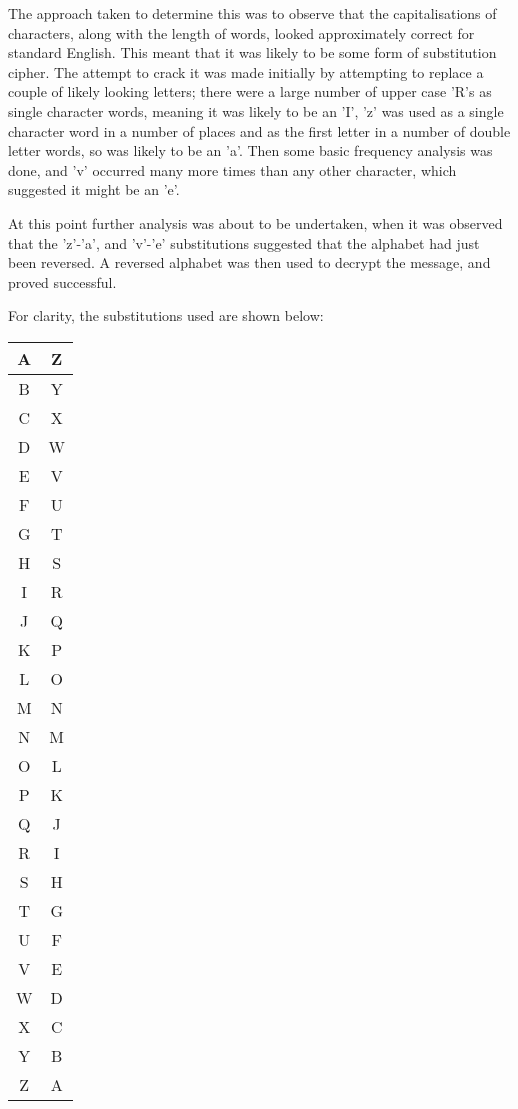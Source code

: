 The approach taken to determine this was to observe that the capitalisations of characters, along with the length of words, looked approximately correct for standard English.
This meant that it was likely to be some form of substitution cipher.
The attempt to crack it was made initially by attempting to replace a couple of likely looking letters; there were a large number of upper case 'R's as single character words, meaning it was likely to be an 'I', 'z' was used as a single character word in a number of places and as the first letter in a number of double letter words, so was likely to be an 'a'.
Then some basic frequency analysis was done, and 'v' occurred many more times than any other character, which suggested it might be an 'e'.

At this point further analysis was about to be undertaken, when it was observed that the 'z'-'a', and 'v'-'e' substitutions suggested that the alphabet had just been reversed.
A reversed alphabet was then used to decrypt the message, and proved successful.

For clarity, the substitutions used are shown below:

\begin{table}[h]
	\centering
	\begin{tabular}[h]{| c | c |}
		\hline
		A	& Z	\\ \hline
		B	& Y	\\ \hline
		C	& X	\\ \hline
		D	& W	\\ \hline
		E	& V	\\ \hline
		F	& U	\\ \hline
		G	& T	\\ \hline
		H	& S	\\ \hline
		I	& R	\\ \hline
		J	& Q	\\ \hline
		K	& P	\\ \hline
		L	& O	\\ \hline
		M	& N	\\ \hline
		N	& M	\\ \hline
		O	& L	\\ \hline
		P	& K	\\ \hline
		Q	& J	\\ \hline
		R	& I	\\ \hline
		S	& H	\\ \hline
		T	& G	\\ \hline
		U	& F	\\ \hline
		V	& E	\\ \hline
		W	& D	\\ \hline
		X	& C	\\ \hline
		Y	& B	\\ \hline
		Z	& A	\\ \hline
	\end{tabular}
\end{table}
